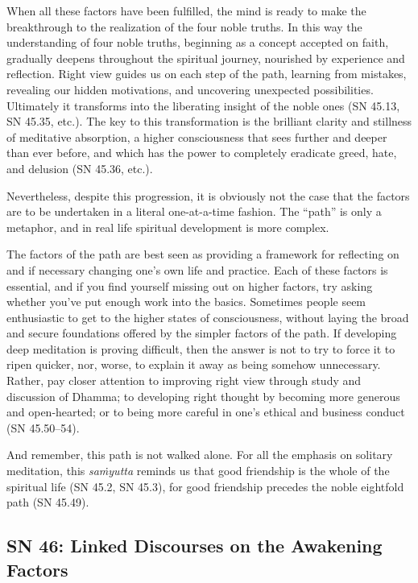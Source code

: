 \documentclass[12pt,openany]{book}%
\begin{document}
When all these factors have been fulfilled, the mind is ready to make the breakthrough to the realization of the four noble truths. In this way the understanding of four noble truths, beginning as a concept accepted on faith, gradually deepens throughout the spiritual journey, nourished by experience and reflection. Right view guides us on each step of the path, learning from mistakes, revealing our hidden motivations, and uncovering unexpected possibilities. Ultimately it transforms into the liberating insight of the noble ones (SN 45.13, SN 45.35, etc.). The key to this transformation is the brilliant clarity and stillness of meditative absorption, a higher consciousness that sees further and deeper than ever before, and which has the power to completely eradicate greed, hate, and delusion (SN 45.36, etc.).

Nevertheless, despite this progression, it is obviously not the case that the factors are to be undertaken in a literal one-at-a-time fashion. The “path” is only a metaphor, and in real life spiritual development is more complex.

The factors of the path are best seen as providing a framework for reflecting on and if necessary changing one’s own life and practice. Each of these factors is essential, and if you find yourself missing out on higher factors, try asking whether you’ve put enough work into the basics. Sometimes people seem enthusiastic to get to the higher states of consciousness, without laying the broad and secure foundations offered by the simpler factors of the path. If developing deep meditation is proving difficult, then the answer is not to try to force it to ripen quicker, nor, worse, to explain it away as being somehow unnecessary. Rather, pay closer attention to improving right view through study and discussion of Dhamma; to developing right thought by becoming more generous and open-hearted; or to being more careful in one’s ethical and business conduct (SN 45.50–54).

And remember, this path is not walked alone. For all the emphasis on solitary meditation, this \textit{\textsanskrit{saṁyutta}} reminds us that good friendship is the whole of the spiritual life (SN 45.2, SN 45.3), for good friendship precedes the noble eightfold path (SN 45.49).

\subsection*{SN 46: Linked Discourses on the Awakening Factors}
\end{document}
